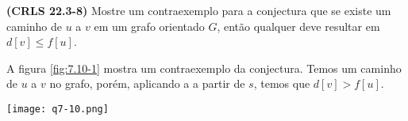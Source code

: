 
\noindent\textbf{(CRLS 22.3-8)} Mostre um contraexemplo para a conjectura que se existe um caminho de $u$
a $v$ em um grafo orientado $G$, então qualquer  deve resultar em $d[v] \leq f[u]$.

A figura \ref{fig:7.10-1} mostra um contraexemplo da conjectura. Temos um caminho de $u$ a $v$ no grafo, porém, aplicando a  a partir de $s$, temos que $d[v] > f[u]$.
\begin{center}
\texttt{[image: q7-10.png]}
\label{fig:7.10-1}
\end{center}